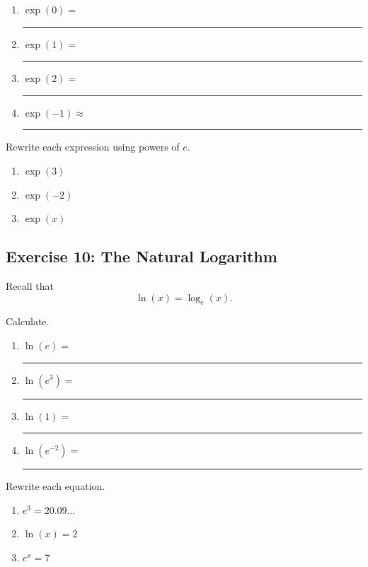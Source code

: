 \documentclass[a4paper, 11pt]{article}
\begin{document}
\begin{enumerate}
    \item $\exp(0)=$ \rule{2cm}{0.4pt}
    \item $\exp(1)=$ \rule{2cm}{0.4pt}
    \item $\exp(2)=$ \rule{2cm}{0.4pt}
    \item $\exp(-1)\approx$ \rule{2cm}{0.4pt}
\end{enumerate}

\vspace{0.5cm}

Rewrite each expression using powers of $e$.

\begin{enumerate}
    \item $\exp(3)$
    \vspace{0.8cm}

    \item $\exp(-2)$
    \vspace{0.8cm}

    \item $\exp(x)$
    \vspace{0.8cm}
\end{enumerate}

\subsection*{Exercise 10: The Natural Logarithm}

Recall that
\[
\ln(x)=\log_e(x).
\]

Calculate.

\begin{enumerate}
    \item $\ln(e)=$ \rule{2cm}{0.4pt}
    \item $\ln(e^3)=$ \rule{2cm}{0.4pt}
    \item $\ln(1)=$ \rule{2cm}{0.4pt}
    \item $\ln(e^{-2})=$ \rule{2cm}{0.4pt}
\end{enumerate}

\vspace{0.5cm}

Rewrite each equation.

\begin{enumerate}
    \item $e^3=20.09\ldots$
    \vspace{1cm}

    \item $\ln(x)=2$
    \vspace{1cm}

    \item $e^x=7$
    \vspace{1cm}
\end{enumerate}
\end{document}
